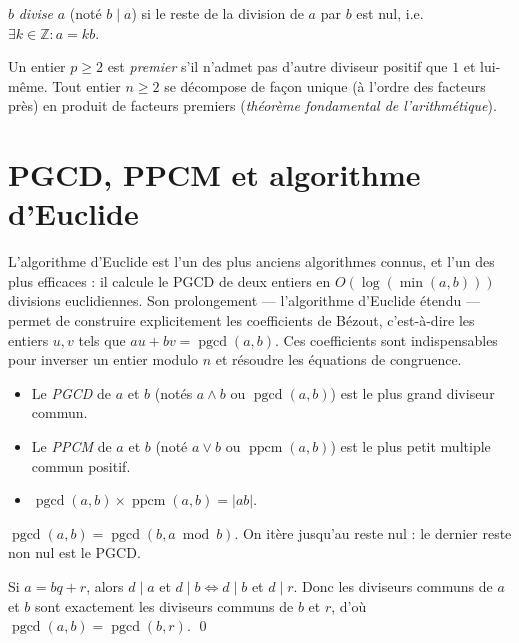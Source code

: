 \documentclass[11pt,a4paper,twoside]{book}
\newcommand{\Z}{\mathbb{Z}}
\DeclareMathOperator{\pgcd}{pgcd}
\DeclareMathOperator{\ppcm}{ppcm}
\begin{document}
\begin{definitionbox}[Divisibilité]
$b$ \emph{divise} $a$ (noté $b \mid a$) si le reste de la division de $a$ par $b$ est nul, i.e.\ $\exists k\in\Z : a=kb$.
\end{definitionbox}

\begin{definitionbox}
Un entier $p \geq 2$ est \emph{premier} s'il n'admet pas d'autre diviseur positif que $1$ et lui-même.
Tout entier $n \geq 2$ se décompose de façon unique (à l'ordre des facteurs près) en produit de facteurs premiers (\emph{théorème fondamental de l'arithmétique}).
\end{definitionbox}

\section{PGCD, PPCM et algorithme d'Euclide}

L'algorithme d'Euclide est l'un des plus anciens algorithmes connus, et l'un des plus efficaces : il calcule le PGCD de deux entiers en $O(\log(\min(a,b)))$ divisions euclidiennes. Son prolongement — l'algorithme d'Euclide étendu — permet de construire explicitement les coefficients de Bézout, c'est-à-dire les entiers $u, v$ tels que $au + bv = \pgcd(a,b)$. Ces coefficients sont indispensables pour inverser un entier modulo $n$ et résoudre les équations de congruence.

\begin{definitionbox}
\begin{itemize}
  \item Le \emph{PGCD} de $a$ et $b$ (notés $a\wedge b$ ou $\pgcd(a,b)$) est le plus grand diviseur commun.
  \item Le \emph{PPCM} de $a$ et $b$ (noté $a\vee b$ ou $\ppcm(a,b)$) est le plus petit multiple commun positif.
  \item $\pgcd(a,b)\times\ppcm(a,b) = |ab|$.
\end{itemize}
\end{definitionbox}

\begin{theoremebox}
$\pgcd(a,b) = \pgcd(b, a \bmod b)$. On itère jusqu'au reste nul : le dernier reste non nul est le PGCD.
\end{theoremebox}

\begin{preuvebox}
Si $a = bq+r$, alors $d \mid a$ et $d \mid b \iff d \mid b$ et $d \mid r$. Donc les diviseurs communs de $a$ et $b$ sont exactement les diviseurs communs de $b$ et $r$, d'où $\pgcd(a,b)=\pgcd(b,r)$. \qed
\end{preuvebox}
\end{document}
